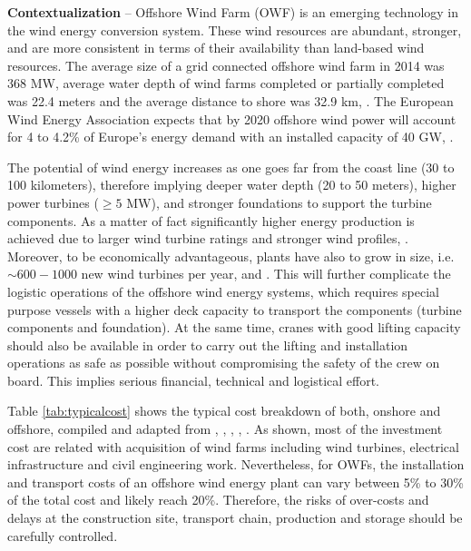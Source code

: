 \textbf{Contextualization} --
Offshore Wind Farm (OWF) is an emerging technology in the wind energy conversion system. These wind resources are abundant, stronger, and are more consistent in terms of their availability than land-based wind resources. The average size of a grid connected offshore wind farm in 2014 was 368 MW, average water depth of wind farms completed or partially completed was 22.4 meters and the average distance to shore was 32.9 km, \cite{Giorgio2015}. The European Wind Energy Association expects that by 2020 offshore wind power will account for 4 to 4.2\% of Europe's energy demand with an installed capacity of 40 GW, \cite{EWEA2011, Kaldellis2013}.

The potential of wind energy increases as one goes far from the coast line (30 to 100 kilometers), therefore implying deeper water depth (20 to 50 meters), higher power turbines ($\geq 5$ MW), and stronger foundations to support the turbine components. As a matter of fact significantly higher energy production is achieved due to larger wind turbine ratings and stronger wind profiles, \cite{Sun2012298}. Moreover, to be economically advantageous, plants have also to grow in size, i.e. $\sim600-1000$ new wind turbines per year, \cite{EWEA2011} and \cite{Kaldellis2013}. This will further complicate the logistic operations of the offshore wind energy systems, which requires special purpose vessels with a higher deck capacity to transport the components (turbine components and foundation). At the same time, cranes with good lifting capacity should also be available in order to carry out the lifting and installation operations as safe as possible without compromising the safety of the crew on board. This implies serious financial, technical and logistical effort.

Table \ref{tab:typicalcost} shows the typical cost breakdown of both, onshore and offshore, compiled and adapted from \cite{Henderson2003}, \cite{Junginger2004}, \cite{UK10}, \cite{TCE12}, \cite{IRENA12}. As shown, most of the investment cost are related with acquisition of wind farms including wind turbines, electrical infrastructure and civil engineering work. Nevertheless, for OWFs, the installation and transport costs of an offshore wind energy plant can vary between 5\% to 30\% of the total cost and likely reach 20\%. Therefore, the risks of over-costs and delays at the construction site, transport chain, production and storage should be carefully controlled.

